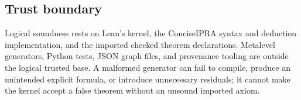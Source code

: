 \subsection{Trust boundary}

Logical soundness rests on Lean's kernel, the ConciseIPRA syntax and deduction implementation, and the imported checked theorem declarations.  Metalevel generators, Python tests, JSON graph files, and provenance tooling are outside the logical trusted base.  A malformed generator can fail to compile, produce an unintended explicit formula, or introduce unnecessary residuals; it cannot make the kernel accept a false theorem without an unsound imported axiom.
